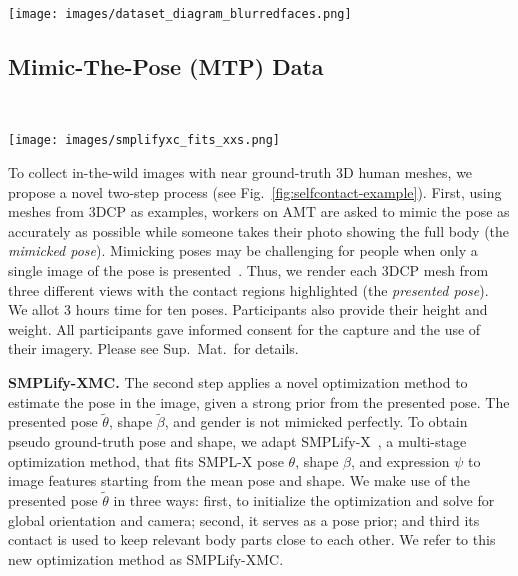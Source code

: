\documentclass[final]{cvpr}
\newcommand{\suppmat}{Sup.~Mat.\xspace}
\newcommand{\mtp}{\mbox{MTP}\xspace}
\newcommand{\smplifyxmc}{\mbox{SMPLify-XMC}\xspace}
\theoremstyle{definition}
\begin{document}
\begin{figure*}[t]
	\texttt{[image: images/dataset\_diagram\_blurredfaces.png]}
	\caption{Mimic-The-Pose (MTP) dataset. MTP is built via: (1) collecting many 3D meshes that exhibit self-contact. In grey, new 3D scans in self-contact poses, in brown self-contact poses optimized from AMASS mocap data.  (2) collecting images in the wild, by asking workers on AMT to mimic poses and contacts.  (3) the presented meshes are refined via \smplifyxmc to match the image features.}
	\label{fig:selfcontact-example}
\end{figure*}

\subsection{Mimic-The-Pose (MTP) Data}~\label{subsection-mtp}
\begin{figure*}[t]
\centerline{		\texttt{[image: images/smplifyxc\_fits\_xxs.png]}}
\vspace{-0.02in}
	\caption{\mtp results. Meshes presented to AMT workers (blue) and the images they submitted with OpenPose keypoints overlaid. In grey, the pseudo ground-truth meshes computed by \smplifyxmc.}
	\label{fig:smplifyxcfits}
\end{figure*}
To collect in-the-wild images with near ground-truth 3D human meshes,  we propose a novel two-step process (see Fig.~\ref{fig:selfcontact-example}). 
First, using meshes from 3DCP as examples, workers on AMT are asked to mimic the pose as accurately as possible while someone takes their photo showing the full body (the \emph{mimicked pose}).
Mimicking poses may be challenging for people when only a single image of the pose is presented~\cite{marinoiu2013pictorial}. 
Thus, we render each 3DCP mesh from three different views with the contact regions highlighted (the \emph{presented pose}).
We allot 3 hours time for ten poses. Participants also provide their height and weight.
All participants gave informed consent for the capture and the use of their imagery.
Please see {\suppmat}~for details.


\textbf{\smplifyxmc.}
The second step applies a novel optimization method to estimate the pose in the image, given a strong prior from the presented pose.
The presented pose $\tilde{\theta}$, shape $\tilde{\beta}$, and gender is not mimicked perfectly.
To obtain pseudo ground-truth pose and shape, we adapt SMPLify-X~\cite{SMPL-X:2019}, a multi-stage optimization method, that fits  SMPL-X pose $\theta$, shape $\beta$, and expression $\psi$ to image features starting from the mean pose and shape. We make use of the presented pose $\tilde{\theta}$ in three ways: first, to initialize the optimization and solve for global orientation and camera; second, it serves as a pose prior; and third its contact is used to keep relevant body parts close to each other. We refer to this new optimization method as \smplifyxmc.
\end{document}
